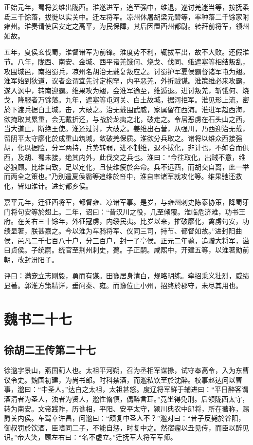 \documentclass[12pt,UTF8]{ctexbook}
\begin{document}
正始元年，蜀将姜维出陇西。淮遂进军，追至强中，维退，遂讨羌迷当等，按抚柔氐三千馀落，拔徙以实关中。迁左将军。凉州休屠胡梁元碧等，率种落二千馀家附雍州。淮奏请使居安定之高平，为民保障，其后因置西州都尉。转拜前将军，领州如故。

五年，夏侯玄伐蜀，淮督诸军为前锋。淮度势不利，辄拔军出，故不大败。还假淮节。八年，陇西、南安、金城、西平诸羌饿何、烧戈、伐同、蛾遮塞等相结叛乱，攻围城邑，南招蜀兵，凉州名胡治无戴复叛应之。讨蜀护军夏侯霸督诸军屯为翅。淮军始到狄道，议者佥谓宜先讨定枹罕，内平恶羌，外折贼谋。淮策维必来攻霸，遂入沨中，转南迎霸。维果攻为翅，会淮军適至，维遁退。进讨叛羌，斩饿何、烧戈，降服者万馀落。九年，遮塞等屯河关、白土故城，据河拒军。淮见形上流，密於下渡兵据白土城，击，大破之。治无戴围武威，家属留在西海。淮进军趋西海，欲掩取其累重，会无戴折还，与战於龙夷之北，破走之。令居恶虏在石头山之西，当大道止，断绝王使。淮还过讨，大破之。姜维出石营，从强川，乃西迎治无戴，留阴平太守廖化於成重山筑城，敛破羌保质。淮欲分兵取之。诸将以维众西接强胡，化以据险，分军两持，兵势转弱，进不制维，退不拔化，非计也，不如合而俱西，及胡、蜀未接，绝其内外，此伐交之兵也。淮曰：“今往取化，出贼不意，维必狼顾。比维自致，足以定化，且使维疲於奔命。兵不远西，而胡交自离，此一举而两全之策也。”乃别遣夏侯霸等追维於沓中，淮自率诸军就攻化等。维果驰还救化，皆如淮计。进封都乡侯。

嘉平元年，迁征西将军，都督雍、凉诸军事。是岁，与雍州刺史陈泰协策，降蜀牙门将句安等於翅上。二年，诏曰：“昔汉川之役，几至倾覆。淮临危济难，功书王府。在关右三十馀年，外征寇虏，内绥民夷。比岁以来，摧破廖化，禽虏句安，功绩显著，朕甚嘉之。今以淮为车骑将军、仪同三司，持节、都督如故。”进封阳曲侯，邑凡二千七百八十户，分三百户，封一子亭侯。正元二年薨，追赠大将军，谥曰贞侯。子统嗣。统官至荆州刺史，薨。子正嗣。咸熙中，开建五等，以淮著勋前朝，改封汾阳子。

评曰：满宠立志刚毅，勇而有谋。田豫居身清白，规略明练。牵招秉义壮烈，威绩显著。郭淮方策精详，垂问秦、雍。而豫位止小州，招终於郡守，未尽其用也。

\part{魏书二十七}
\chapter{徐胡二王传第二十七}

徐邈字景山，燕国蓟人也。太祖平河朔，召为丞相军谋掾，试守奉高令，入为东曹议令史。魏国初建，为尚书郎。时科禁酒，而邈私饮至於沈醉。校事赵达问以曹事，邈曰：“中圣人。”达白之太祖，太祖甚怒。度辽将军鲜于辅进曰：“平日醉客谓酒清者为圣人，浊者为贤人，邈性脩慎，偶醉言耳。”竟坐得免刑。后领陇西太守，转为南安。文帝践阼，历谯相，平阳、安平太守，颍川典农中郎将，所在著称，赐爵关内侯。车驾幸许昌，问邈曰：“颇复中圣人不？”邈对曰：“昔子反毙於谷阳，御叔罚於饮酒，臣嗜同二子，不能自惩，时复中之。然宿瘤以丑见传，而臣以醉见识。”帝大笑，顾左右曰：“名不虚立。”迁抚军大将军军师。
\end{document}
